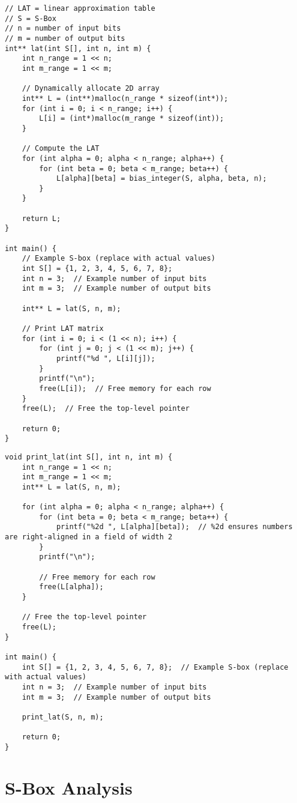 \newpage
\begin{lstlisting}[style=C]
// LAT = linear approximation table
// S = S-Box
// n = number of input bits
// m = number of output bits
int** lat(int S[], int n, int m) {
	int n_range = 1 << n;
	int m_range = 1 << m;
	
	// Dynamically allocate 2D array
	int** L = (int**)malloc(n_range * sizeof(int*));
	for (int i = 0; i < n_range; i++) {
		L[i] = (int*)malloc(m_range * sizeof(int));
	}
	
	// Compute the LAT
	for (int alpha = 0; alpha < n_range; alpha++) {
		for (int beta = 0; beta < m_range; beta++) {
			L[alpha][beta] = bias_integer(S, alpha, beta, n);
		}
	}
	
	return L;
}

int main() {
	// Example S-box (replace with actual values)
	int S[] = {1, 2, 3, 4, 5, 6, 7, 8};  
	int n = 3;  // Example number of input bits
	int m = 3;  // Example number of output bits
	
	int** L = lat(S, n, m);
	
	// Print LAT matrix
	for (int i = 0; i < (1 << n); i++) {
		for (int j = 0; j < (1 << m); j++) {
			printf("%d ", L[i][j]);
		}
		printf("\n");
		free(L[i]);  // Free memory for each row
	}
	free(L);  // Free the top-level pointer
	
	return 0;
}
\end{lstlisting}
\newpage
\begin{lstlisting}[style=C]
void print_lat(int S[], int n, int m) {
	int n_range = 1 << n;
	int m_range = 1 << m;
	int** L = lat(S, n, m);
	
	for (int alpha = 0; alpha < n_range; alpha++) {
		for (int beta = 0; beta < m_range; beta++) {
			printf("%2d ", L[alpha][beta]);  // %2d ensures numbers are right-aligned in a field of width 2
		}
		printf("\n");
		
		// Free memory for each row
		free(L[alpha]);
	}
	
	// Free the top-level pointer
	free(L);
}

int main() {
	int S[] = {1, 2, 3, 4, 5, 6, 7, 8};  // Example S-box (replace with actual values)
	int n = 3;  // Example number of input bits
	int m = 3;  // Example number of output bits
	
	print_lat(S, n, m);
	
	return 0;
}
\end{lstlisting}


\newpage
\section{S-Box Analysis}


